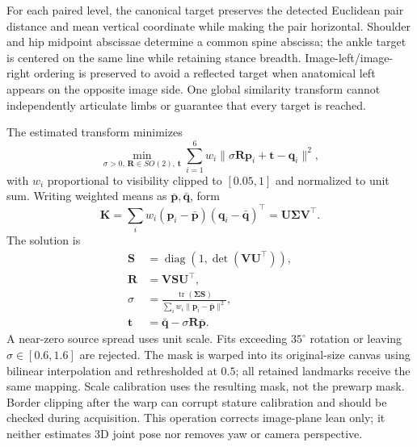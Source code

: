\documentclass[11pt,a4paper]{article}
\numberwithin{equation}{section}
\begin{document}
For each paired level, the canonical target preserves the detected Euclidean pair distance and mean vertical coordinate while making the pair horizontal. Shoulder and hip midpoint abscissae determine a common spine abscissa; the ankle target is centered on the same line while retaining stance breadth. Image-left/image-right ordering is preserved to avoid a reflected target when anatomical left appears on the opposite image side. One global similarity transform cannot independently articulate limbs or guarantee that every target is reached.

The estimated transform minimizes
\begin{equation}
\min_{\sigma>0,\,\mathbf R\in SO(2),\,\mathbf t}
\sum_{i=1}^{6}w_i\|\sigma\mathbf R\mathbf p_i+\mathbf t-\mathbf q_i\|^2,
\label{eq:procrustes_objective}
\end{equation}
with $w_i$ proportional to visibility clipped to $[0.05,1]$ and normalized to unit sum. Writing weighted means as $\bar{\mathbf p},\bar{\mathbf q}$, form
\begin{equation}
\mathbf K=\sum_iw_i(\mathbf p_i-\bar{\mathbf p})(\mathbf q_i-\bar{\mathbf q})^\top
=\mathbf U\mathbf\Sigma\mathbf V^\top.
\label{eq:svd_cov}
\end{equation}
The solution is
\begin{align}
\mathbf S&=\operatorname{diag}(1,\det(\mathbf V\mathbf U^\top)),\nonumber\\
\mathbf R&=\mathbf V\mathbf S\mathbf U^\top,\label{eq:rotation}\\
\sigma&=\frac{\operatorname{tr}(\mathbf\Sigma\mathbf S)}{\sum_iw_i\|\mathbf p_i-\bar{\mathbf p}\|^2},\label{eq:procrustes_scale_trans}\\
\mathbf t&=\bar{\mathbf q}-\sigma\mathbf R\bar{\mathbf p}.\nonumber
\end{align}
A near-zero source spread uses unit scale. Fits exceeding $35^\circ$ rotation or leaving $\sigma\in[0.6,1.6]$ are rejected. The mask is warped into its original-size canvas using bilinear interpolation and rethresholded at $0.5$; all retained landmarks receive the same mapping. Scale calibration uses the resulting mask, not the prewarp mask. Border clipping after the warp can corrupt stature calibration and should be checked during acquisition. This operation corrects image-plane lean only; it neither estimates 3D joint pose nor removes yaw or camera perspective.
\end{document}
